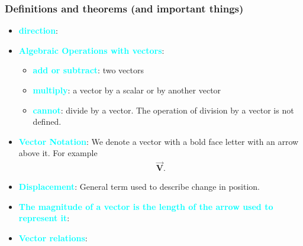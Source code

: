 \documentclass{report}
\begin{document}
    \subsubsection{Definitions and theorems (and important things)}
    \begin{itemize}
        \item \textbf{\textcolor{cyan}{direction}}:
        \item \textbf{\textcolor{cyan}{Algebraic Operations with vectors}}:
            \begin{itemize}
                \item \textbf{\textcolor{cyan}{add or subtract}}: two vectors
                \item \textbf{\textcolor{cyan}{multiply}}: a vector by a scalar or by another vector
                \item \textbf{\textcolor{cyan}{cannot}}: divide by a vector. The operation of division by a vector is not defined.
            \end{itemize}
        \item \textbf{\textcolor{cyan}{Vector Notation}}: We denote a vector with a bold face letter with an arrow above it. For example
            \begin{align*}
                \vec{\textbf{V}}
            .\end{align*}
        \item \textbf{\textcolor{cyan}{Displacement}}: General term used to describe change in position.
        \item \textbf{\textcolor{cyan}{The magnitude of a vector is the length of the arrow used to represent it}}:

        \item \textbf{\textcolor{cyan}{Vector relations}}:


\end{itemize}
\end{document}
